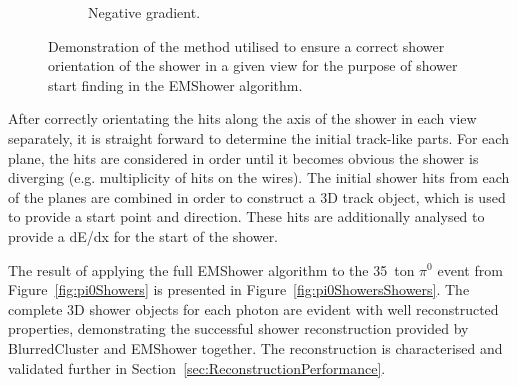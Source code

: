 \begin{figure}
\begin{subfigure}[t]{0.48\linewidth}
    \caption{Negative gradient.}
    \label{fig:EMShowerOrientationNegative}
  \end{subfigure}
  \caption[Demonstration of the method utilised to ensure a correct shower orientation of the shower in a given view for the purpose of shower start finding in the EMShower algorithm.]{Demonstration of the method utilised to ensure a correct shower orientation of the shower in a given view for the purpose of shower start finding in the EMShower algorithm.}
  \label{fig:EMShowerOrientation}
\end{figure}

After correctly orientating the hits along the axis of the shower in each view separately, it is straight forward to determine the initial track-like parts.  For each plane, the hits are considered in order until it becomes obvious the shower is diverging (e.g. multiplicity of hits on the wires).  The initial shower hits from each of the planes are combined in order to construct a 3D track object, which is used to provide a start point and direction.  These hits are additionally analysed to provide a dE/dx for the start of the shower.

The result of applying the full EMShower algorithm to the 35~ton $\pi^0$ event from Figure~\ref{fig:pi0Showers} is presented in Figure~\ref{fig:pi0ShowersShowers}.  The complete 3D shower objects for each photon are evident with well reconstructed properties, demonstrating the successful shower reconstruction provided by BlurredCluster and EMShower together.  The reconstruction is characterised and validated further in Section~\ref{sec:ReconstructionPerformance}.

